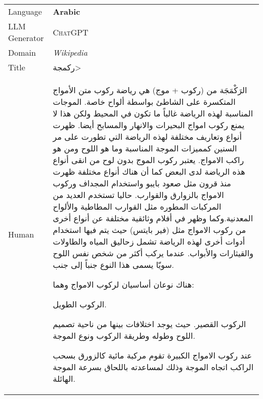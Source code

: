 
\clearpage
 \begin{center}
 \footnotesize
	\tabletail{%
		\bottomrule
	}
	\tablelasttail{\bottomrule}
	\begin{supertabular}{l | p{12cm}}
        Language &  \textbf{Arabic} \\
        LLM Generator & \textsc{ChatGPT} \\
        Domain &  \textit{Wikipedia} \\
        \midrule
        Title & \<ركمجة>\\
        \midrule
        Human &  {\small \begin{RLtext}
        الرَكْمَجَة من (ركوب + موج) هي رياضة ركوب متن الأمواج المتكسرة على الشاطئ بواسطة ألواح خاصة. الموجات المناسبة لهذه الرياضة غالباً ما تكون في المحيط ولكن هذا لا يمنع ركوب امواج البحيرات والانهار والمسابح أيضا.  ظهرت أنواع وتعاريف مختلفة لهذه الرياضة التي تطورت على مر السنين  كمميزات الموجة المناسبة وما هو اللوح ومن هو راكب الامواج. يعتبر ركوب الموج بدون لوح من انقى أنواع هذه الرياضة لدى البعض كما أن هناك أنواع مختلفة ظهرت منذ قرون مثل  صعود بايبو واستخدام المجداف وركوب  الامواج  بالزوارق  والقوارب. حاليا تستخدم العديد من المركبات المطوره مثل القوارب المطاطية والألواح المعدنية.وكما وظهر في أفلام  وثائقية مختلفة عن أنواع أخرى من ركوب الامواج مثل (فير بايتس) حيث يتم فيها استخدام أدوات أخرى لهذه الرياضة  تشمل زحاليق المياه والطاولات والقيثارات والأبواب. عندما يركب أكثر من شخص نفس اللوح سويّا يسمى هذا النوع جنباً إلى جنب.
        
        هناك نوعان أساسيان  لركوب الامواج  وهما:
        
        الركوب الطويل.
        
        الركوب القصير. حيث يوجد اختلافات بينها من ناحية تصميم اللوح وطوله وطريقة الركوب ونوع الموجة.
        
        عند ركوب الامواج الكبيرة تقوم مركبة مائية كالزورق بسحب الراكب اتجاه الموجة وذلك لمساعدته باللحاق بسرعة الموجة الهائلة.
        
        \end{RLtext}}\\
        

\end{supertabular}
\end{center}
